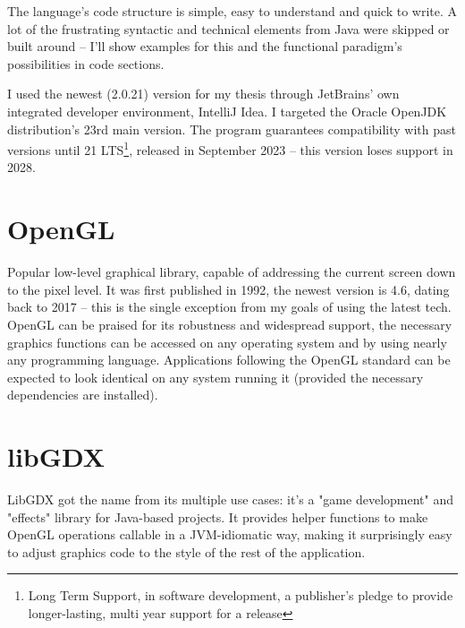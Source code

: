 The language's code structure is simple, easy to understand and quick to write. A lot of the frustrating syntactic and technical elements from Java were skipped or built around -- I'll show examples for this and the functional paradigm's possibilities in code sections.

I used the newest (2.0.21) version for my thesis through JetBrains' own integrated developer environment, IntelliJ Idea. I targeted the Oracle OpenJDK distribution's 23rd main version. The program guarantees compatibility with past versions until 21 LTS\footnote{Long Term Support, in software development, a publisher's pledge to provide longer-lasting, multi year support for a release}, released in September 2023 -- this version loses support in 2028.~\cite{JavaRoadmap}

\section{OpenGL }

Popular low-level graphical library, capable of addressing the current screen down to the pixel level. It was first published in 1992, the newest version is 4.6, dating back to 2017 -- this is the single exception from my goals of using the latest tech.~\cite{OpenglHistory} OpenGL can be praised for its robustness and widespread support, the necessary graphics functions can be accessed on any operating system and by using nearly any programming language. Applications following the OpenGL standard can be expected to look identical on any system running it (provided the necessary dependencies are installed).

\section{libGDX }

LibGDX got the name from its multiple use cases: it's a "game development" and "effects" library for Java-based projects. It provides helper functions to make OpenGL operations callable in a JVM-idiomatic way, making it surprisingly easy to adjust graphics code to the style of the rest of the application.

